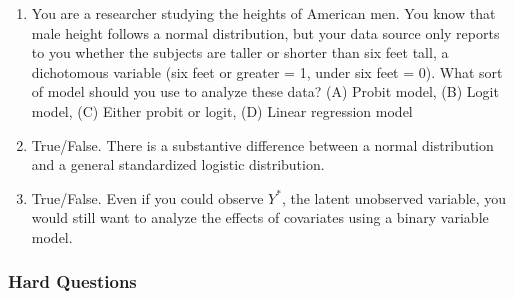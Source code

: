 \documentclass[11pt]{article}
\begin{document}
\begin{enumerate}
\item You are a researcher studying the heights of American men. You know that male height follows a normal distribution, but your data source only reports to you whether the subjects are taller or shorter than six feet tall, a dichotomous variable (six feet or greater = 1, under six feet = 0). What sort of model should you use to analyze these data? (A) Probit model, (B) Logit model, (C) Either probit or logit, (D) Linear regression model 
\item True/False. There is a substantive difference between a normal distribution and a general standardized logistic distribution. 
\item True/False. Even if you could observe $Y^*$, the latent unobserved variable, you would still want to analyze the effects of covariates using a binary variable model.
\end{enumerate}

\subsubsection{Hard Questions}
\end{document}
